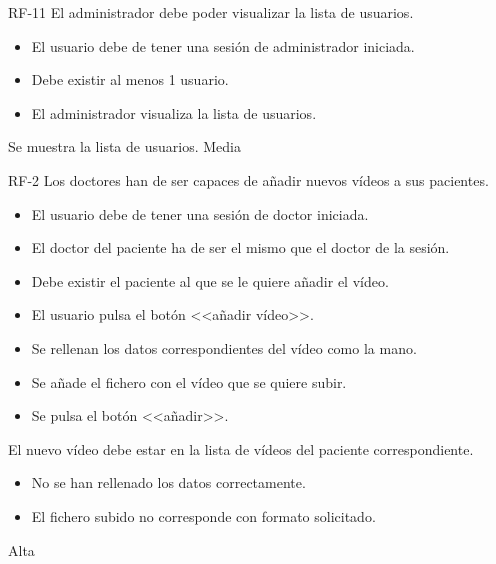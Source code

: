 {RF-11}
{El administrador debe poder visualizar la lista de usuarios.}
{	\begin{itemize}
	\def\labelenumi{\arabic{enumi}.}
	\tightlist
	\item El usuario debe de tener una sesión de administrador iniciada.
	\item Debe existir al menos 1 usuario.
	\end{itemize}}
{
	\begin{itemize}
	\def\labelenumi{\arabic{enumi}.}
	\tightlist
    \item El administrador visualiza la lista de usuarios.
    \end{itemize}
}
{Se muestra la lista de usuarios.}
{}
{Media}

{RF-2}
{Los doctores han de ser capaces de añadir nuevos vídeos a sus pacientes.}
{	\begin{itemize}
	\def\labelenumi{\arabic{enumi}.}
	\tightlist
	\item El usuario debe de tener una sesión de doctor iniciada.
	\item El doctor del paciente ha de ser el mismo que el doctor de la sesión.
	\item Debe existir el paciente al que se le quiere añadir el vídeo.
	\end{itemize}}
{
	\begin{itemize}
	\def\labelenumi{\arabic{enumi}.}
	\tightlist
    \item El usuario pulsa el botón <<añadir vídeo>>.
    \item Se rellenan los datos correspondientes del vídeo como la mano.
    \item Se añade el fichero con el vídeo que se quiere subir.
    \item Se pulsa el botón <<añadir>>.
    \end{itemize}
}
{El nuevo vídeo debe estar en la lista de vídeos del paciente correspondiente.}
{\begin{itemize}
	\def\labelenumi{\arabic{enumi}.}
	\tightlist
	\item No se han rellenado los datos correctamente.
	\item El fichero subido no corresponde con formato solicitado.
	\end{itemize}}
{Alta}

